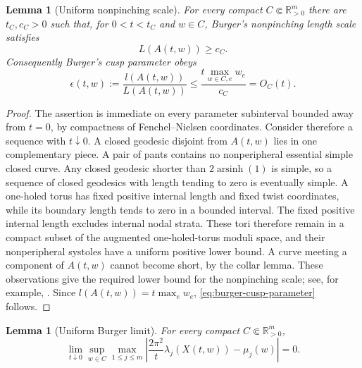 \documentclass[11pt,reqno]{amsart}
\newtheorem{lemma}[theorem]{Lemma}
\theoremstyle{definition}
\theoremstyle{remark}
\newcommand{\R}{\mathbb R}
\begin{document}
\begin{lemma}[Uniform nonpinching scale]\label{lem:nonpinching-scale}
For every compact $C\Subset\R_{>0}^{m}$ there are $t_C,c_C>0$ such that,
for $0<t<t_C$ and $w\in C$, Burger's nonpinching length scale satisfies
\[
  L(A(t,w))\ge c_C.
\]
Consequently Burger's cusp parameter obeys
\begin{equation}\label{eq:burger-cusp-parameter}
  \epsilon(t,w):=\frac{l(A(t,w))}{L(A(t,w))}
  \le \frac{t\max_{w\in C,e}w_e}{c_C}=O_C(t).
\end{equation}
\end{lemma}

\begin{proof}
The assertion is immediate on every parameter subinterval bounded away from
$t=0$, by compactness of Fenchel--Nielsen coordinates.  Consider therefore a
sequence with $t\downarrow0$.  A closed geodesic disjoint from $A(t,w)$ lies
in one complementary piece.  A pair of pants contains no nonperipheral
essential simple closed curve.  Any closed geodesic shorter than
$2\operatorname{arsinh}(1)$ is simple, so a sequence of closed geodesics
with length tending to zero is eventually simple.  A one-holed torus has
fixed positive internal length and fixed twist coordinates, while its
boundary length tends to zero in a bounded interval.  The fixed positive
internal length excludes internal nodal strata.  These tori therefore remain
in a compact subset of the augmented one-holed-torus moduli space, and their
nonperipheral systoles have a uniform positive lower bound.  A curve meeting
a component of $A(t,w)$ cannot become short, by the collar lemma.  These
observations give the required lower bound for the nonpinching scale; see,
for example,
\cite[Chapters~3--4]{Buser1992}.  Since
$l(A(t,w))=t\max_e w_e$, \eqref{eq:burger-cusp-parameter} follows.
\end{proof}

\begin{lemma}[Uniform Burger limit]\label{lem:burger-uniform}
For every compact $C\Subset\R_{>0}^{m}$,
\begin{equation}\label{eq:burger-uniform}
 \lim_{t\downarrow0}\sup_{w\in C}\max_{1\le j\le m}
 \left|\frac{2\pi^2}{t}\lambda_j(X(t,w))-\mu_j(w)\right|=0.
\end{equation}
\end{lemma}
\end{document}
